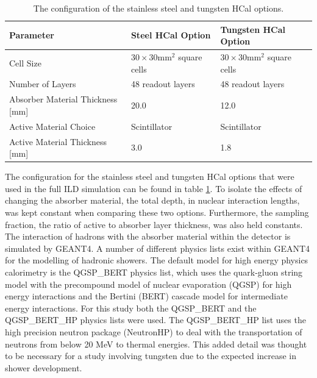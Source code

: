 \begin{table}[h!]
\centering
\begin{tabular}{ l l l }
\hline
Parameter & Steel HCal Option & Tungsten HCal Option \\
\hline
Cell Size & $30 \times 30 \text{mm}^{2}$ square cells & $30 \times 30 \text{mm}^{2}$ square cells\\
Number of Layers & 48 readout layers & 48 readout layers\\
Absorber Material Thickness [mm] & 20.0 & 12.0 \\
Active Material Choice & Scintillator & Scintillator \\
Active Material Thickness [mm] & 3.0 & 1.8 \\
\hline
\end{tabular}
\caption[The configuration of the stainless steel and tungsten HCal options.]{The configuration of the stainless steel and tungsten HCal options.}
\label{table:hcalabsmaterial}
\end{table}

The configuration for the stainless steel and tungsten HCal options that were used in the full ILD simulation can be found in table \ref{table:hcalabsmaterial}.  To isolate the effects of changing the absorber material, the total depth, in nuclear interaction lengths, was kept constant when comparing these two options.  Furthermore, the sampling fraction, the ratio of active to absorber layer thickness, was also held constants.  The interaction of hadrons with the absorber material within the detector is simulated by GEANT4.  A number of different physics lists exist within GEANT4 for the modelling of hadronic showers.  The default model for high energy physics calorimetry is the QGSP\_BERT physics list, which uses the quark-gluon string model \cite{Folger:2003sb} with the precompound model of nuclear evaporation \cite{geantStringModel} (QGSP) for high energy interactions and the Bertini (BERT) cascade model \cite{Guthrie:1968ue} for intermediate energy interactions.  For this study both the QGSP\_BERT and the QGSP\_BERT\_HP physics lists were used.  The QGSP\_BERT\_HP list uses the high precision neutron package (NeutronHP) to deal with the transportation of neutrons from below 20 MeV to thermal energies.  This added detail was thought to be necessary for a study involving tungsten due to the expected increase in shower development.    


